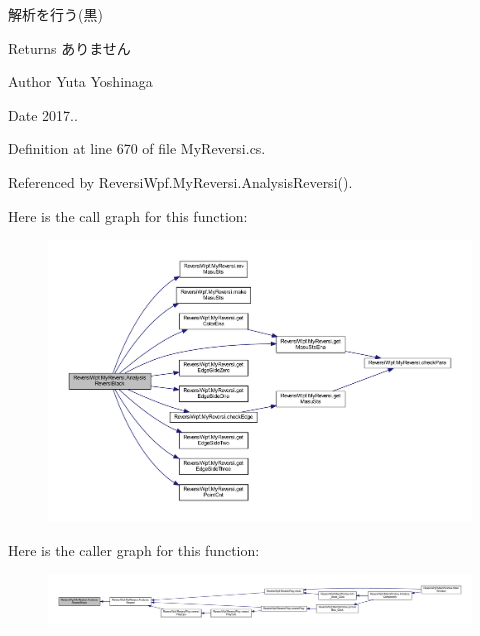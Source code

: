 解析を行う(黒) 

\begin{DoxyReturn}{Returns}
ありません 
\end{DoxyReturn}
\begin{DoxyAuthor}{Author}
Yuta Yoshinaga 
\end{DoxyAuthor}
\begin{DoxyDate}{Date}
2017.. 
\end{DoxyDate}


Definition at line 670 of file My\+Reversi.\+cs.



Referenced by Reversi\+Wpf.\+My\+Reversi.\+Analysis\+Reversi().

Here is the call graph for this function\+:\nopagebreak
\begin{figure}[H]
\begin{center}
\leavevmode
\includegraphics[width=350pt]{class_reversi_wpf_1_1_my_reversi_af7ca68ea9f05d79c1debbdc320555098_cgraph}
\end{center}
\end{figure}
Here is the caller graph for this function\+:\nopagebreak
\begin{figure}[H]
\begin{center}
\leavevmode
\includegraphics[width=350pt]{class_reversi_wpf_1_1_my_reversi_af7ca68ea9f05d79c1debbdc320555098_icgraph}
\end{center}
\end{figure}
\mbox{\label{class_reversi_wpf_1_1_my_reversi_a7be281b0dbae11afb652260b4d30f128}} 
